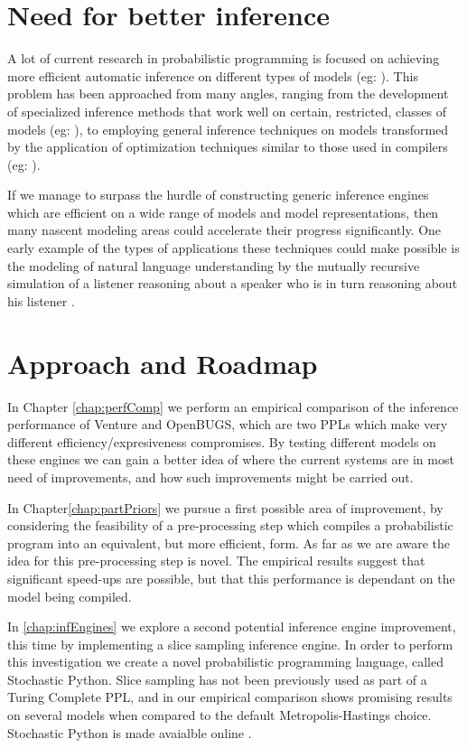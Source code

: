 \section{Need for better inference}
\label{sect:betInf}
A lot of current research in probabilistic programming is focused on achieving more efficient automatic inference on different types of models (eg: \cite{goodman2013principles, wingate2011nonstandard, wood2014new}). This problem has been approached from many angles, ranging from the development of specialized inference methods that work well on certain, restricted, classes of models (eg: \cite{stuhlmuller2012dynamic, yeh2012synthesizing}), to employing general inference techniques on models transformed by the application of optimization techniques similar to those used in compilers (eg: \cite{mansinghka2014venture, yang2013incrementalizing}).

If we manage to surpass the hurdle of constructing generic inference engines which are efficient on a wide range of models and model representations, then many nascent modeling areas could accelerate their progress significantly. One early example of the types of applications these techniques could make possible is the modeling of natural language understanding by the mutually recursive simulation of a listener reasoning about a speaker who is in turn reasoning about his listener \cite{goodman2013knowledge, frank2012predicting}. 

\section{Approach and Roadmap}
In Chapter \ref{chap:perfComp} we perform an empirical comparison of the inference performance of Venture and OpenBUGS, which are two PPLs which make very different efficiency/expresiveness compromises. By testing different models on these engines we can gain a better idea of where the current systems are in most need of improvements, and how such improvements might be carried out. 

In Chapter\ref{chap:partPriors} we pursue a first possible area of improvement, by considering the feasibility of a pre-processing step which compiles a probabilistic program into an equivalent, but more efficient, form. As far as we are aware the idea for this pre-processing step is novel. The empirical results suggest that significant speed-ups are possible, but that this performance is dependant on the model being compiled. 

In \ref{chap:infEngines} we explore a second potential inference engine improvement, this time by implementing a slice sampling inference engine. In order to perform this investigation we create a novel probabilistic programming language, called Stochastic Python. Slice sampling has not been previously used as part of a Turing Complete PPL, and in our empirical comparison shows promising results on several models when compared to the default Metropolis-Hastings choice. Stochastic Python is made avaialble online \cite{stocPy}. 


